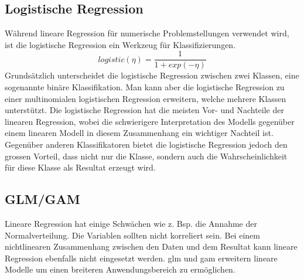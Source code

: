 \documentclass[
  12pt, %
  a4paper, %
  oneside, %
  openany, 
  numbers=noenddot, %
  BCOR=5mm, %
  parskip=half*, %
  thesis, %
]{bfhbook}
\begin{document}
\subsection{Logistische Regression}
\label{logR}
Während lineare Regression für numerische Problemstellungen verwendet wird, ist die logistische Regression ein Werkzeug für Klassifizierungen.
\[logistic(\eta)=\frac{1}{1+exp(-\eta)}\]
Grundsätzlich unterscheidet die logistische Regression zwischen zwei Klassen, eine sogenannte binäre Klassifikation. Man kann aber die logistische Regression zu einer  multinomialen logistischen Regression erweitern, welche mehrere Klassen unterstützt.
Die logistische Regression hat die meisten Vor- und Nachteile der linearen Regression, wobei die schwierigere Interpretation des Modells gegenüber einem linearen Modell in diesem Zusammenhang ein wichtiger Nachteil ist. Gegenüber anderen Klassifikatoren bietet die logistische Regression jedoch den grossen Vorteil, dass nicht nur die Klasse, sondern auch die Wahrscheinlichkeit für diese Klasse als Resultat erzeugt wird.
\subsection{GLM/GAM}
\label{gam}
Lineare Regression hat einige Schwächen wie z. Bsp. die Annahme der Normalverteilung. Die Variablen sollten nicht korreliert sein. Bei einem nichtlinearen Zusammenhang zwischen den Daten und dem Resultat kann lineare Regression ebenfalls nicht eingesetzt werden. \acrfull{glm} und \acrfull{gam} erweitern lineare Modelle um einen breiteren Anwendungsbereich zu ermöglichen.
\end{document}
